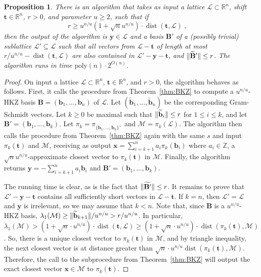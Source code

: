 \documentclass[11pt]{article}
\newtheorem{proposition}[theorem]{Proposition}
\newcommand{\R}{\ensuremath{\mathbb{R}}}
\newcommand{\Z}{\ensuremath{\mathbb{Z}}}
\renewcommand{\vec}[1]{\ensuremath{\mathbf{#1}}}
\newcommand{\basis}{\ensuremath{\mathbf{B}}}
\newcommand{\poly}{\mathrm{poly}}
\newcommand{\M}{\mathcal{M}}
\newcommand{\lat}{\mathcal{L}}
\newcommand{\gs}[1]{\ensuremath{\widetilde{#1}}}
\DeclareMathOperator{\dist}{dist}
\DeclarePairedDelimiter\length{\lVert}{\rVert}
\begin{document}
 \begin{proposition}
\label{prop:shiftedsublattice}
 There is an algorithm that takes as input a lattice $\lat \subset \R^n $, shift $\vec{t} \in \R^n$, $r > 0$,  and parameter $u \geq 2$, such that if \[
 r \geq u^{n/u} (1+\sqrt{n} u^{n/u}) \cdot \dist(\vec{t}, \lat)
 \; ,
 \] 
 then the output of the algorithm is $\vec{y} \in \lat$ and a basis $\basis'$ of a (possibly trivial) sublattice $\lat' \subseteq \lat $ such that all vectors from $\lat - \vec{t}$ of length at most $r/u^{n/u} - \dist(\vec{t}, \lat)$ are also contained in $\lat' - \vec{y} - \vec{t}$, and $\length{\gs{\basis}'} \leq r$. The algorithm runs in time $\poly(n) \cdot 2^{O(u)}$.
 \end{proposition}
\begin{proof}
 On input a lattice $\lat \subset \R^n$, $\vec{t} \in \R^n$, and $r > 0$, the algorithm behaves as follows. First, it calls the procedure from  Theorem~\ref{thm:BKZ} to compute a $u^{n/u}$-HKZ basis $\basis  = (\vec{b}_1, \ldots, \vec{b}_n)$ of $\lat$. Let $(\gs{\vec{b}}_1, \ldots, \gs{\vec{b}}_n)$ be the corresponding Gram-Schmidt vectors. Let $k \geq 0$ be maximal such that $\length{\gs{\vec{b}}_i} \le r$ for $1 \le i \le k$, and let $\basis' = (\vec{b}_1, \ldots, \vec{b}_k)$.  Let $\pi_k = \pi_{\{ \vec{b}_1, \ldots, \vec{b}_k \}^\perp}$ and $\M = \pi_k(\lat)$. The algorithm then calls the procedure from Theorem~\ref{thm:BKZ} again with the same $s$ and input $\pi_k(\vec{t})$ and $\M$, receiving as output $\vec{x} = \sum_{i=k+1}^n a_i \pi_k(\vec{b}_i)$ where $a_i \in \Z$, a $\sqrt{n} u^{n/u}$-approximate closest vector to $\pi_k(\vec{t})$ in $\M$. Finally, the algorithm returns $\vec{y} = -\sum_{i=k+1}^n a_i \vec{b}_i$ and  $\basis' = (\vec{b}_1, \ldots, \vec{b}_k)$.
 
The running time is clear, as is the fact that $\length{\gs{\basis'}} \leq r$. It remains to prove that $\lat' - \vec{y} - \vec{t}$ contains all sufficiently short vectors in $\lat - \vec{t}$. If $k = n$, then $\lat' = \lat$ and $\vec{y}$ is irrelevant, so we may assume that $k < n$. Note that, since $\basis$ is a $u^{n/u}$-HKZ basis, $\lambda_1(\M) \geq \length{\gs{\vec{b}}_{k+1}}/u^{n/u} > r/u^{n/u}$.  In particular, $\lambda_1(\M)  > (1+\sqrt{n} \cdot u^{n/u})\cdot \dist(\vec{t}, \lat) \geq (1+\sqrt{n} \cdot u^{n/u})\cdot \dist(\pi_k(\vec{t}), \M)$. So, there is a unique closest vector to $\pi_k(\vec{t})$ in $\M$, and by triangle inequality, the next closest vector is at distance greater than $\sqrt{n} \cdot u^{n/u}\dist(\pi_k(\vec{t}), \M)$. Therefore, the call to the subprocedure from Theorem~\ref{thm:BKZ} will output the exact closest vector $\vec{x} \in \M$ to $\pi_k(\vec{t})$.


\end{proof}
\end{document}
